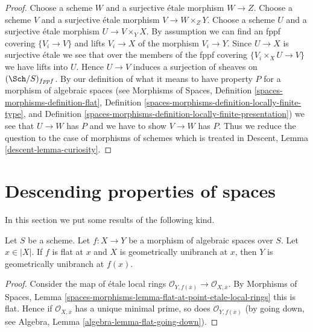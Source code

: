 \begin{proof}
Choose a scheme $W$ and a surjective \'etale morphism $W \to Z$.
Choose a scheme $V$ and a surjective \'etale morphism $V \to W \times_Z Y$.
Choose a scheme $U$ and a surjective \'etale morphism $U \to V \times_Y X$.
By assumption we can find an fppf covering $\{V_i \to V\}$ and
lifts $V_i \to X$ of the morphism $V_i \to Y$. Since $U \to X$ is surjective
\'etale we see that over the members of the fppf covering
$\{V_i \times_X U \to V\}$ we have lifts into $U$. Hence $U \to V$ induces
a surjection of sheaves on $(\Sch/S)_{fppf}$.
By our definition of what it means to have property $P$ for a
morphism of algebraic spaces (see
Morphisms of Spaces,
Definition \ref{spaces-morphisms-definition-flat},
Definition \ref{spaces-morphisms-definition-locally-finite-type}, and
Definition \ref{spaces-morphisms-definition-locally-finite-presentation})
we see that $U \to W$ has $P$ and we have to show $V \to W$ has $P$.
Thus we reduce the question to the case of morphisms of schemes
which is treated in
Descent, Lemma \ref{descent-lemma-curiosity}.
\end{proof}










\section{Descending properties of spaces}
\label{section-descending-properties-spaces}

\noindent
In this section we put some results of the following kind.

\begin{lemma}
\label{lemma-descend-unibranch}
Let $S$ be a scheme.
Let $f : X \to Y$ be a morphism of algebraic spaces over $S$.
Let $x \in |X|$.
If $f$ is flat at $x$ and $X$ is geometrically unibranch at $x$, then $Y$ is
geometrically unibranch at $f(x)$.
\end{lemma}

\begin{proof}
Consider the map of \'etale local rings
$\mathcal{O}_{Y, f(\overline{x})} \to \mathcal{O}_{X, \overline{x}}$.
By
Morphisms of Spaces, Lemma
\ref{spaces-morphisms-lemma-flat-at-point-etale-local-rings}
this is flat. Hence if $\mathcal{O}_{X, \overline{x}}$ has a unique minimal
prime, so does $\mathcal{O}_{Y, f(\overline{x})}$ (by going down, see
Algebra, Lemma \ref{algebra-lemma-flat-going-down}).
\end{proof}

